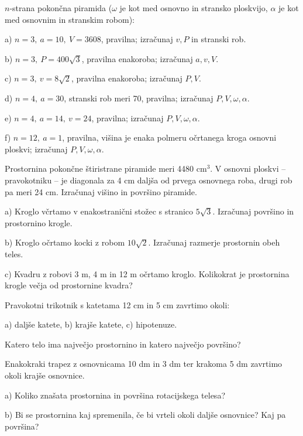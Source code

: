 \documentclass[a4paper,11pt]{letter}
\begin{document}
\begin{naloga}
$n$-strana pokončna piramida ($\omega$ je kot med osnovno in stransko ploskvijo,
$\alpha$ je kot med osnovnim in stranskim robom):

a) $n=3,\ a=10,\ V=3608$, pravilna; \quad izračunaj $v,P$ in stranski rob.

b) $n=3,\ P=400\sqrt{3}$, pravilna enakoroba; \quad izračunaj $a,v,V$.

c) $n=3,\ v=8\sqrt{2}$, pravilna enakoroba; \quad izračunaj $P,V$.

d) $n=4,\ a=30$, stranski rob meri 70, pravilna; \quad izračunaj $P,V,\omega,\alpha$.

e) $n=4,\ a=14,\ v=24$, pravilna; \quad izračunaj $P,V,\omega,\alpha$.

f) $n=12,\ a=1$, pravilna, višina je enaka polmeru očrtanega kroga osnovni ploskvi;
\quad izračunaj $P,V,\omega,\alpha$.
\end{naloga}

\begin{naloga}
Prostornina pokončne štiristrane piramide meri 4480 cm$^3$. V osnovni ploskvi -- pravokotniku --
je diagonala za 4 cm daljša od prvega osnovnega roba, drugi rob pa meri 24 cm.
Izračunaj višino in površino piramide.
\end{naloga}
\newpage
\begin{naloga}
a) Kroglo včrtamo v enakostranični stožec s stranico $5\sqrt{3}$.
Izračunaj površino in prostornino krogle.

b) Kroglo očrtamo kocki z robom $10\sqrt{2}$. Izračunaj razmerje prostornin obeh teles.

c) Kvadru z robovi 3 m, 4 m in 12 m očrtamo kroglo.
Kolikokrat je prostornina krogle večja od prostornine kvadra?
\end{naloga}

\begin{naloga}
Pravokotni trikotnik s katetama 12 cm in 5 cm zavrtimo okoli:

a) daljše katete, \quad b) krajše katete, \quad c) hipotenuze.

Katero telo ima največjo prostornino in katero največjo površino?
\end{naloga}

\begin{naloga}
Enakokraki trapez z osnovnicama 10 dm in 3 dm ter krakoma 5 dm zavrtimo okoli krajše osnovnice.

a) Koliko znašata prostornina in površina rotacijskega telesa?

b) Bi se prostornina kaj spremenila, če bi vrteli okoli daljše osnovnice? Kaj pa površina?
\end{naloga}
\end{document}
